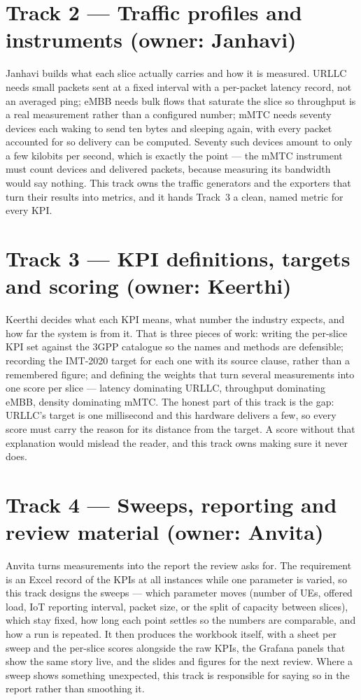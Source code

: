 \documentclass[11pt,a4paper]{article}
\begin{document}
\section*{Track 2 --- Traffic profiles and instruments (owner: Janhavi)}

Janhavi builds what each slice actually carries and how it is measured. URLLC needs small packets
sent at a fixed interval with a per-packet latency record, not an averaged ping; eMBB needs bulk
flows that saturate the slice so throughput is a real measurement rather than a configured number;
mMTC needs seventy devices each waking to send ten bytes and sleeping again, with every packet
accounted for so delivery can be computed. Seventy such devices amount to only a few kilobits per
second, which is exactly the point --- the mMTC instrument must count devices and delivered packets,
because measuring its bandwidth would say nothing. This track owns the traffic generators and the
exporters that turn their results into metrics, and it hands Track~3 a clean, named metric for every
KPI.

\section*{Track 3 --- KPI definitions, targets and scoring (owner: Keerthi)}

Keerthi decides what each KPI means, what number the industry expects, and how far the system is
from it. That is three pieces of work: writing the per-slice KPI set against the 3GPP catalogue so
the names and methods are defensible; recording the IMT-2020 target for each one with its source
clause, rather than a remembered figure; and defining the weights that turn several measurements
into one score per slice --- latency dominating URLLC, throughput dominating eMBB, density
dominating mMTC. The honest part of this track is the gap: URLLC's target is one millisecond and
this hardware delivers a few, so every score must carry the reason for its distance from the target.
A score without that explanation would mislead the reader, and this track owns making sure it never
does.

\section*{Track 4 --- Sweeps, reporting and review material (owner: Anvita)}

Anvita turns measurements into the report the review asks for. The requirement is an Excel record of
the KPIs at all instances while one parameter is varied, so this track designs the sweeps --- which
parameter moves (number of UEs, offered load, IoT reporting interval, packet size, or the split of
capacity between slices), which stay fixed, how long each point settles so the numbers are
comparable, and how a run is repeated. It then produces the workbook itself, with a sheet per sweep
and the per-slice scores alongside the raw KPIs, the Grafana panels that show the same story live,
and the slides and figures for the next review. Where a sweep shows something unexpected, this track
is responsible for saying so in the report rather than smoothing it.
\end{document}
